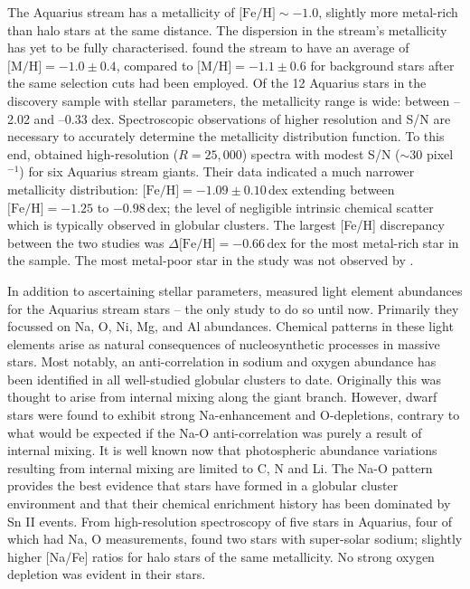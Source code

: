 \documentclass{emulateapj}
\begin{document}
The Aquarius stream has a metallicity of $\mbox{[Fe/H]} \sim -1.0$, slightly more metal-rich than halo stars at the same distance. The dispersion in the stream's metallicity has yet to be fully characterised. \citet{williams;et-al_2011} found the stream to have an average of $\mbox{[M/H]} = -1.0 \pm 0.4$, compared to $\mbox{[M/H]} = -1.1 \pm 0.6$ for background stars after the same selection cuts had been employed. Of the 12 Aquarius stars in the \citet{williams;et-al_2011} discovery sample with stellar parameters, the metallicity range is wide: between --2.02 and --0.33 dex. Spectroscopic observations of higher resolution and S/N are necessary to accurately determine the metallicity distribution function. To this end, \citet{wylie-de-boer;et-al_2012} obtained high-resolution ($R = 25,000$) spectra with modest S/N ($\sim$30 pixel$^{-1}$) for six Aquarius stream giants. Their data indicated a much narrower metallicity distribution: $\mbox{[Fe/H]} = -1.09 \pm 0.10$\,dex extending between $\mbox{[Fe/H]} = -1.25$ to $-0.98$\,dex; the level of negligible intrinsic chemical scatter which is typically observed in globular clusters. The largest [Fe/H] discrepancy between the two studies was $\Delta\mbox{[Fe/H]} = -0.66$\,dex for the most metal-rich star in the \citet{williams;et-al_2011} sample. The most metal-poor star in the \citet{williams;et-al_2011} study was not observed by \citet{wylie-de-boer;et-al_2012}.


In addition to ascertaining stellar parameters, \citet{wylie-de-boer;et-al_2012} measured light element abundances for the Aquarius stream stars -- the only study to do so until now. Primarily they focussed on Na, O, Ni, Mg, and Al abundances. Chemical patterns in these light elements arise as natural consequences of nucleosynthetic processes in massive stars. Most notably, an anti-correlation in sodium and oxygen abundance has been identified in all well-studied globular clusters to date. Originally this was thought to arise from internal mixing along the giant branch. However, dwarf stars were found to exhibit strong Na-enhancement and O-depletions, contrary to what would be expected if the Na-O anti-correlation was purely a result of internal mixing. It is well known now that photospheric abundance variations resulting from internal mixing are limited to C, N and Li. The Na-O pattern provides the best evidence that stars have formed in a globular cluster environment and that their chemical enrichment history has been dominated by Sn II events. From high-resolution spectroscopy of five stars in Aquarius, four of which had Na, O measurements, \citet{wylie-de-boer;et-al_2012} found two stars with super-solar sodium; slightly higher [Na/Fe] ratios for halo stars of the same metallicity. No strong oxygen depletion was evident in their stars.
\end{document}
